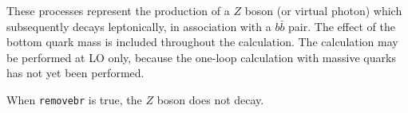 \label{subsec:zbb}

These processes represent the production of a $Z$ boson (or virtual photon)
which subsequently decays leptonically, in association
with a $b{\bar b}$ pair. The effect of
the bottom quark mass is included throughout the calculation.
The calculation may be performed at LO only, because the one-loop
calculation with massive quarks has not yet been performed.

When {\tt removebr} is true, the $Z$ boson does not decay.
